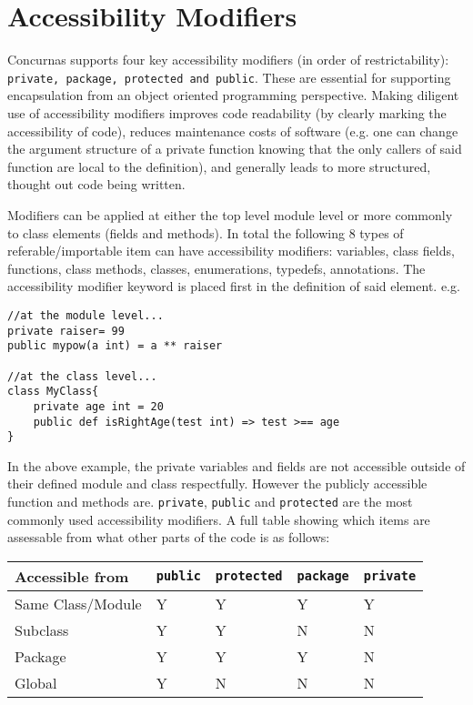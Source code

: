 \documentclass[conc-doc]{subfiles}
\begin{document}
	
	\chapter[Accessibility Modifiers]{Accessibility Modifiers}

Concurnas supports four key accessibility modifiers (in order of restrictability): \lstinline{private, package, protected and public}. These are essential for supporting encapsulation from an object oriented programming perspective. Making diligent use of accessibility modifiers improves code readability (by clearly marking the accessibility of code), reduces maintenance costs of software (e.g. one can change the argument structure of a private function knowing that the only callers of said function are local to the definition), and generally leads to more structured, thought out code being written.

Modifiers can be applied at either the top level module level or more commonly to class elements (fields and methods). In total the following 8 types of referable/importable item can have accessibility modifiers: variables, class fields, functions, class methods, classes, enumerations, typedefs, annotations. The accessibility modifier keyword is placed first in the definition of said element. e.g.
\begin{lstlisting}
//at the module level...
private raiser= 99
public mypow(a int) = a ** raiser

//at the class level...
class MyClass{
	private age int = 20
	public def isRightAge(test int) => test >== age
}
\end{lstlisting}

In the above example, the private variables and fields are not accessible outside of their defined module and class respectfully. However the publicly accessible function and methods are. \lstinline{private}, \lstinline{public} and \lstinline{protected} are the most commonly used accessibility modifiers. A full table showing which items are assessable from what other parts of the code is as follows:


\begin{table}[H]
	\centering
	\begin{tabular}{lllll}
		\hline
		Accessible from&\lstinline!public!&\lstinline!protected!&\lstinline!package!&\lstinline!private!\\
		\hline
		Same Class/Module&Y&Y&Y&Y\\
		Subclass&Y&Y&N&N\\
		Package&Y&Y&Y&N\\
		Global&Y&N&N&N\\
		\hline
	\end{tabular}%
\end{table}
\end{document}
